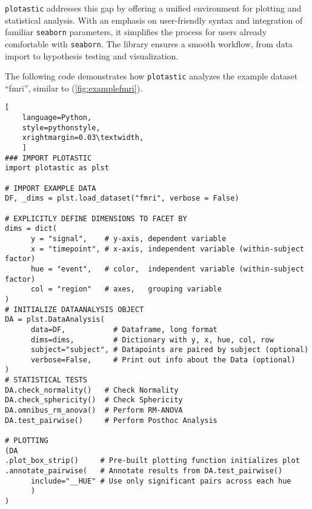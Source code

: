 \texttt{plotastic} addresses this gap by offering a unified environment for
plotting and statistical analysis. With an emphasis on user-friendly
syntax and integration of familiar \texttt{seaborn} parameters, it simplifies
the process for users already comfortable with \texttt{seaborn}. The library
ensures a smooth workflow, from data import to hypothesis testing and
visualization.



\newpage



%
\label{sec:C2_example}%
The following code demonstrates how \texttt{plotastic} analyzes the
example dataset ``fmri'', similar to \citet{waskomSeabornStatisticalData2021}
(\autoref{fig:examplefmri}).

\begin{lstlisting}[
    language=Python, 
    style=pythonstyle,
    xrightmargin=0.03\textwidth,
    ]
### IMPORT PLOTASTIC
import plotastic as plst

# IMPORT EXAMPLE DATA
DF, _dims = plst.load_dataset("fmri", verbose = False)

# EXPLICITLY DEFINE DIMENSIONS TO FACET BY
dims = dict(
      y = "signal",    # y-axis, dependent variable
      x = "timepoint", # x-axis, independent variable (within-subject factor)
      hue = "event",   # color,  independent variable (within-subject factor)
      col = "region"   # axes,   grouping variable
)
# INITIALIZE DATAANALYSIS OBJECT
DA = plst.DataAnalysis(
      data=DF,           # Dataframe, long format
      dims=dims,         # Dictionary with y, x, hue, col, row 
      subject="subject", # Datapoints are paired by subject (optional)
      verbose=False,     # Print out info about the Data (optional)
)
# STATISTICAL TESTS
DA.check_normality()   # Check Normality
DA.check_sphericity()  # Check Sphericity
DA.omnibus_rm_anova()  # Perform RM-ANOVA
DA.test_pairwise()     # Perform Posthoc Analysis

# PLOTTING
(DA
.plot_box_strip()     # Pre-built plotting function initializes plot
.annotate_pairwise(   # Annotate results from DA.test_pairwise()
      include="__HUE" # Use only significant pairs across each hue
      ) 
)
\end{lstlisting}






